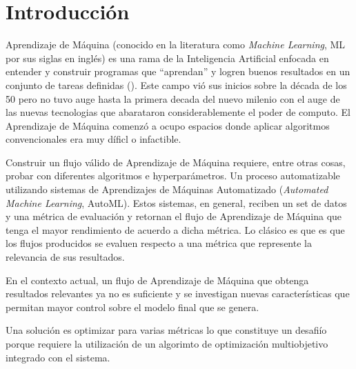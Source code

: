 
\chapter*{Introducción}\label{chapter:introduction}

Aprendizaje de M\'aquina (conocido en la literatura como \textit{Machine Learning}, ML por sus siglas en ingl\'es) es una rama de la Inteligencia Artificial enfocada en entender y construir programas que ``aprendan'' y logren buenos resultados en un conjunto de tareas definidas (\cite{mitchell1990machine}). Este campo vi\'o sus inicios sobre la d\'ecada de los 50 pero no tuvo auge hasta la primera decada del nuevo milenio con el auge de las nuevas tecnologias que abarataron considerablemente el poder de computo. El Aprendizaje de M\'aquina comenz\'o a ocupo espacios donde aplicar algoritmos convencionales era muy d\'ificl o infactible.

Construir un flujo v\'alido de Aprendizaje de M\'aquina requiere, entre otras cosas, probar con diferentes algoritmos e hyperpar\'ametros. Un proceso automatizable utilizando sistemas de Aprendizajes de M\'aquinas Automatizado (\textit{Automated Machine Learning}, AutoML).
Estos sistemas, en general, reciben un set de datos y una m\'etrica de evaluaci\'on y retornan el flujo de Aprendizaje de M\'aquina que tenga el mayor rendimiento de acuerdo a dicha m\'etrica. Lo cl\'asico es que es que los flujos producidos se evaluen respecto a una m\'etrica que represente la relevancia de sus resultados. 

En el contexto actual, un flujo de Aprendizaje de M\'aquina que obtenga resultados relevantes ya no es suficiente y se investigan nuevas caracter\'isticas que permitan mayor control sobre el modelo final que se genera.  

Una soluci\'on es optimizar para varias m\'etricas lo que constituye un desafi\'io porque requiere la utilizaci\'on de un algorimto de optimizaci\'on multiobjetivo integrado con el sistema.


